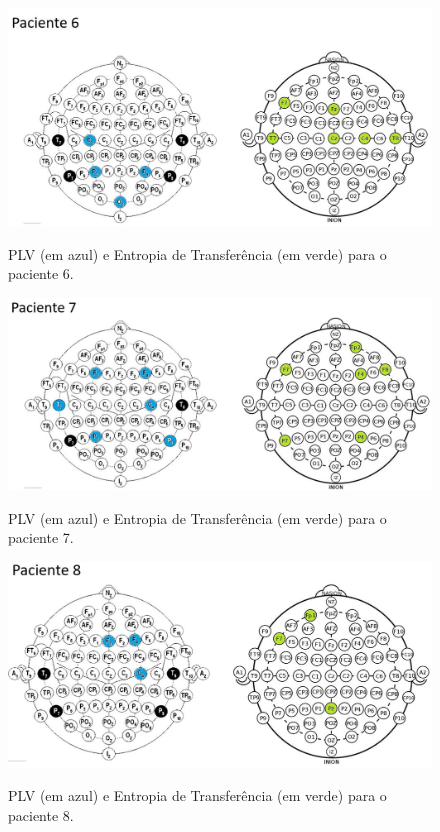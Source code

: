 \documentclass[
	12pt,				%
	openright,			%
	twoside,			%
	a4paper,			%
	english,			%
	french,				%
	spanish,			%
	brazil				%
	]{abntex2}
\begin{document}
\begin{figure}[]
\centering
\includegraphics[width=17cm]{figs/p6.JPG}
\label{eeg}
\caption{PLV (em azul) e Entropia de Transferência (em verde) para o paciente 6.}
\end{figure}

\begin{figure}[]
\centering
\includegraphics[width=17cm]{figs/p7.JPG}
\label{eeg}
\caption{PLV (em azul) e Entropia de Transferência (em verde) para o paciente 7.}
\end{figure}

\begin{figure}[]
\centering
\includegraphics[width=17cm]{figs/p8.JPG}
\label{eeg}
\caption{PLV (em azul) e Entropia de Transferência (em verde) para o paciente 8.}
\end{figure}
\end{document}
